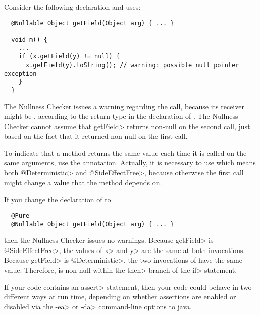 
Consider the following declaration and uses:

\begin{Verbatim}
  @Nullable Object getField(Object arg) { ... }

  void m() {
    ...
    if (x.getField(y) != null) {
      x.getField(y).toString(); // warning: possible null pointer exception
    }
  }
\end{Verbatim}

The Nullness Checker issues a warning regarding the
 call, because its receiver  might
be , according to the  return type in the
declaration of .  The Nullness Checker cannot assume that
\<getField> returns non-null on the second call, just based on the fact
that it returned non-null on the first call.

To indicate that a method returns the same value each time it is called on
the same arguments, use the  annotation.
Actually, it is necessary to use  which
means both \<@Deterministic> and \<@SideEffectFree>, because otherwise the
first call might change a value that the method depends on.

If you change the declaration of  to

\begin{Verbatim}
  @Pure
  @Nullable Object getField(Object arg) { ... }
\end{Verbatim}

\noindent
then the Nullness Checker issues no warnings.
Because \<getField> is \<@SideEffectFree>, the values of \<x> and \<y> are the
same at both invocations.
Because \<getField> is \<@Deterministic>, the two invocations of
 have the same value.
Therefore,  is non-null within the \<then> branch
of the \<if> statement.




If your code contains an \<assert> statement, then your code could behave
in two different ways at run time, depending on whether assertions are
enabled or disabled
via the \<-ea> or \<-da> command-line options to java.

